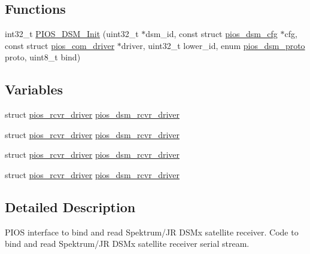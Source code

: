 \subsection*{\-Functions}
\begin{DoxyCompactItemize}
\item 
int32\-\_\-t \hyperlink{group___p_i_o_s___d_s_m_ga546d34996bb1c4dd734a5a90da3fab42}{\-P\-I\-O\-S\-\_\-\-D\-S\-M\-\_\-\-Init} (uint32\-\_\-t $\ast$dsm\-\_\-id, const struct \hyperlink{structpios__dsm__cfg}{pios\-\_\-dsm\-\_\-cfg} $\ast$cfg, const struct \hyperlink{structpios__com__driver}{pios\-\_\-com\-\_\-driver} $\ast$driver, uint32\-\_\-t lower\-\_\-id, enum \hyperlink{group___p_i_o_s___d_s_m_ga0c64890f0b9cb4fd7681b2d92fad8bd9}{pios\-\_\-dsm\-\_\-proto} proto, uint8\-\_\-t bind)
\end{DoxyCompactItemize}
\subsection*{\-Variables}
\begin{DoxyCompactItemize}
\item 
struct \hyperlink{structpios__rcvr__driver}{pios\-\_\-rcvr\-\_\-driver} \hyperlink{group___p_i_o_s___d_s_m_ga2bfdf466752a6865225de7d8136958b7}{pios\-\_\-dsm\-\_\-rcvr\-\_\-driver}
\item 
struct \hyperlink{structpios__rcvr__driver}{pios\-\_\-rcvr\-\_\-driver} \hyperlink{group___p_i_o_s___d_s_m_ga2bfdf466752a6865225de7d8136958b7}{pios\-\_\-dsm\-\_\-rcvr\-\_\-driver}
\item 
struct \hyperlink{structpios__rcvr__driver}{pios\-\_\-rcvr\-\_\-driver} \hyperlink{group___p_i_o_s___d_s_m_ga2bfdf466752a6865225de7d8136958b7}{pios\-\_\-dsm\-\_\-rcvr\-\_\-driver}
\item 
struct \hyperlink{structpios__rcvr__driver}{pios\-\_\-rcvr\-\_\-driver} \hyperlink{group___p_i_o_s___d_s_m_ga2bfdf466752a6865225de7d8136958b7}{pios\-\_\-dsm\-\_\-rcvr\-\_\-driver}
\end{DoxyCompactItemize}


\subsection{\-Detailed \-Description}
\-P\-I\-O\-S interface to bind and read \-Spektrum/\-J\-R \-D\-S\-Mx satellite receiver. \-Code to bind and read \-Spektrum/\-J\-R \-D\-S\-Mx satellite receiver serial stream. 

